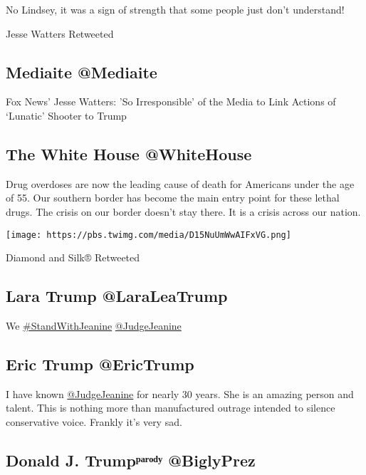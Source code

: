 No Lindsey, it was a sign of strength that some people just don't
understand!

Jesse Watters Retweeted

\hypertarget{mediaite-mediaite}{%
\subsection{Mediaite @Mediaite}\label{mediaite-mediaite}}

Fox News' Jesse Watters: 'So Irresponsible' of the Media to Link Actions
of `Lunatic' Shooter to Trump

\hypertarget{the-white-house-whitehouse-1}{%
\subsection{The White House
@WhiteHouse}\label{the-white-house-whitehouse-1}}

Drug overdoses are now the leading cause of death for Americans under
the age of 55. Our southern border has become the main entry point for
these lethal drugs. The crisis on our border doesn't stay there. It is a
crisis across our nation.

\texttt{[image: https://pbs.twimg.com/media/D15NuUmWwAIFxVG.png]}

Diamond and Silk® Retweeted

\hypertarget{lara-trump-laraleatrump}{%
\subsection{Lara Trump @LaraLeaTrump}\label{lara-trump-laraleatrump}}

We
\href{https://twitter.com/search?q=\%23StandWithJeanine}{\#StandWithJeanine}
\href{https://www.twitter.com/JudgeJeanine}{@JudgeJeanine}

\hypertarget{eric-trump-erictrump}{%
\subsection{Eric Trump @EricTrump}\label{eric-trump-erictrump}}

I have known \href{https://www.twitter.com/JudgeJeanine}{@JudgeJeanine}
for nearly 30 years. She is an amazing person and talent. This is
nothing more than manufactured outrage intended to silence conservative
voice. Frankly it's very sad.

\hypertarget{donald-j-trumpux1d56ux1d43ux2b3ux1d52ux1d48ux2b8-biglyprez}{%
\subsection{Donald J. Trumpᵖᵃʳᵒᵈʸ
@BiglyPrez}\label{donald-j-trumpux1d56ux1d43ux2b3ux1d52ux1d48ux2b8-biglyprez}}

